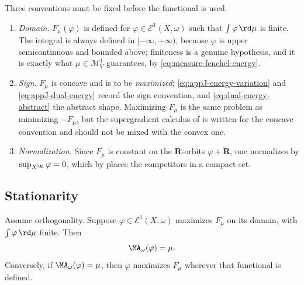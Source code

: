 Three conventions must be fixed before the functional is used.

\begin{enumerate}
\item \emph{Domain.}  $F_\mu(\varphi)$ is defined for
$\varphi\in\mathcal E^1(X,\omega)$ such that $\int\varphi\,\rd\mu$ is
finite.  The integral is always defined in $[-\infty,+\infty)$, because
$\varphi$ is upper semicontinuous and bounded above; finiteness is a
genuine hypothesis, and it is exactly what $\mu\in\mathcal M^1_V$
guarantees, by \eqref{eq:measure-fenchel-energy}.
\item \emph{Sign.}  $F_\mu$ is concave and is to be \emph{maximized};
\eqref{eq:appJ-energy-variation} and \eqref{eq:appJ-dual-energy} record the
sign convention, and \eqref{eq:dual-energy-abstract} the abstract shape.
Maximizing $F_\mu$ is the same problem as minimizing $-F_\mu$, but
the supergradient calculus of
 is written for the concave convention and
should not be mixed with the convex one.
\item \emph{Normalization.}  Since $F_\mu$ is constant on the
$\mathbf R$-orbits $\varphi+\mathbf R$, one normalizes by
$\sup_{X^{\An}}\varphi=0$, which by
 places the competitors in a compact set.
\end{enumerate}

\subsection{Stationarity}
\label{sec:ch27-stationarity}

\begin{proposition}\label{prop:bfj-euler-lagrange}
Assume orthogonality. Suppose
$\varphi\in\mathcal E^1(X,\omega)$ maximizes $F_\mu$ on its domain,
with $\int\varphi\,\rd\mu$ finite. Then
\begin{equation}\label{eq:euler-lagrange-equation}
                           \MA_\omega(\varphi)=\mu.
\end{equation}
Conversely, if $\MA_\omega(\varphi)=\mu$, then $\varphi$ maximizes
$F_\mu$ wherever that functional is defined.
\end{proposition}

